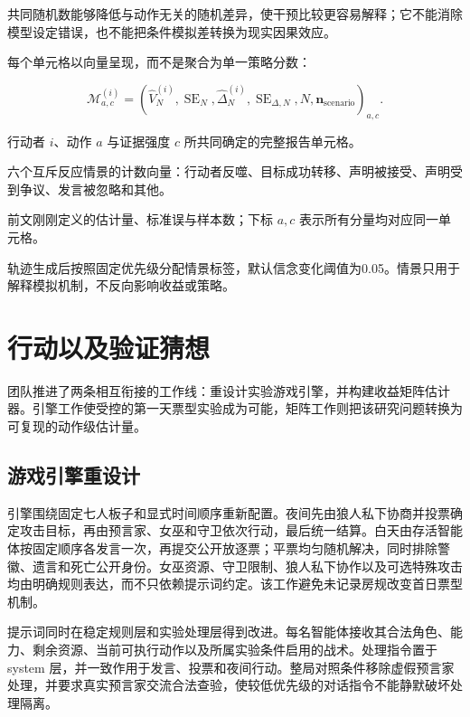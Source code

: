 \documentclass[UTF8,11pt,a4paper,fontset=windows]{ctexart}
\begin{document}
共同随机数能够降低与动作无关的随机差异，使干预比较更容易解释；它不能消除模型设定错误，也不能把条件模拟差转换为现实因果效应。

每个单元格以向量呈现，而不是聚合为单一策略分数：

\[
\mathcal M^{(i)}_{a,c}=
\left(\widehat V_N^{(i)},\operatorname{SE}_N,
\widehat\Delta_N^{(i)},\operatorname{SE}_{\Delta,N},
N,\mathbf n_{\mathrm{scenario}}\right)_{a,c}.
\]

\begin{description}[style=nextline,leftmargin=3.4cm,labelwidth=3.0cm]
  \item[$\mathcal M^{(i)}_{a,c}$] 行动者 $i$、动作 $a$ 与证据强度 $c$ 所共同确定的完整报告单元格。
  \item[$\mathbf n_{\mathrm{scenario}}$] 六个互斥反应情景的计数向量：行动者反噬、目标成功转移、声明被接受、声明受到争议、发言被忽略和其他。
  \item[其他分量] 前文刚刚定义的估计量、标准误与样本数；下标 $a,c$ 表示所有分量均对应同一单元格。
\end{description}

轨迹生成后按照固定优先级分配情景标签，默认信念变化阈值为0.05。情景只用于解释模拟机制，不反向影响收益或策略。

\section{行动以及验证猜想}

团队推进了两条相互衔接的工作线：重设计实验游戏引擎，并构建收益矩阵估计器。引擎工作使受控的第一天票型实验成为可能，矩阵工作则把该研究问题转换为可复现的动作级估计量。

\subsection{游戏引擎重设计}

引擎围绕固定七人板子和显式时间顺序重新配置。夜间先由狼人私下协商并投票确定攻击目标，再由预言家、女巫和守卫依次行动，最后统一结算。白天由存活智能体按固定顺序各发言一次，再提交公开放逐票；平票均匀随机解决，同时排除警徽、遗言和死亡公开身份。女巫资源、守卫限制、狼人私下协作以及可选特殊攻击均由明确规则表达，而不只依赖提示词约定。该工作避免未记录房规改变首日票型机制。

提示词同时在稳定规则层和实验处理层得到改进。每名智能体接收其合法角色、能力、剩余资源、当前可执行动作以及所属实验条件启用的战术。处理指令置于 system 层，并一致作用于发言、投票和夜间行动。整局对照条件移除虚假预言家处理，并要求真实预言家交流合法查验，使较低优先级的对话指令不能静默破坏处理隔离。
\end{document}
